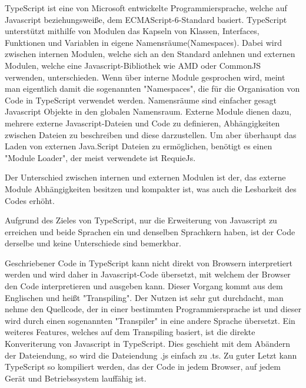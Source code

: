 \label{sec:TypeScript}

TypeScript ist eine von Microsoft entwickelte Programmiersprache, welche auf Javascript beziehungsweiße, dem ECMAScript-6-Standard basiert. TypeScript unterstützt mithilfe von Modulen das Kapseln von Klassen, Interfaces, Funktionen und Variablen in eigene Namensräume(Namespaces). Dabei wird zwischen internen Modulen, welche sich an den Standard anlehnen und externen Modulen, welche eine Javascript-Bibliothek wie AMD oder CommonJS verwenden, unterschieden. Wenn über interne Module gesprochen wird, meint man eigentlich damit die sogenannten "Namespaces", die für die Organisation von Code in TypeScript verwendet werden. Namensräume sind einfacher gesagt Javascript Objekte in den globalen Namensraum. Externe Module dienen dazu, mehrere externe Javascript-Dateien und Code zu definieren, Abhängigkeiten zwischen Dateien zu beschreiben und diese darzustellen. Um aber überhaupt das Laden von externen Java.Script Dateien zu ermöglichen, benötigt es einen "Module Loader", der meist verwendete ist RequieJs.

Der Unterschied zwischen internen und externen Modulen ist der, das externe Module Abhängigkeiten besitzen und kompakter ist, was auch die Lesbarkeit des Codes erhöht.

\cite{TypeScript}\cite{IntModules}\cite{ExtModules}



Aufgrund des Zieles von TypeScript, nur die Erweiterung von Javascript zu erreichen und beide Sprachen ein und denselben Sprachkern haben, ist der Code derselbe und keine Unterschiede sind bemerkbar. 
\cite{TypeScript}


Geschriebener Code in TypeScript kann nicht direkt von Browsern interpretiert werden und wird daher in Javascript-Code übersetzt, mit welchem der Browser den Code interpretieren und ausgeben kann. Dieser Vorgang kommt aus dem Englischen und heißt "Transpiling". Der Nutzen ist sehr gut durchdacht, man nehme den Quellcode, der in einer bestimmten Programmiersprache ist und dieser wird durch einen sogenannten "Transpiler" in eine andere Sprache übersetzt. Ein weiteres Features, welches auf dem Transpiling basiert, ist die direkte Konveriterung von Javascript in TypeScript. Dies geschieht mit dem Abändern der Dateiendung, so wird die Dateiendung .js einfach zu .ts. Zu guter Letzt kann TypeScript so kompiliert werden, das der Code in jedem Browser, auf jedem Gerät und Betriebssystem lauffähig ist. \cite{Differnces}


